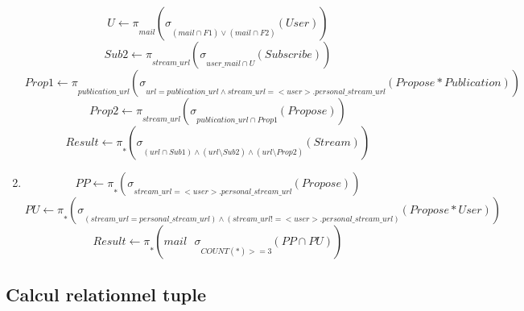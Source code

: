 \documentclass[a4paper,10pt]{article}
\begin{document}
\begin{enumerate}
\begin{equation}
		\end{equation}
		\begin{equation}
		U \leftarrow \pi \underset{mail}{} (\sigma \underset{(mail \cap F1) \vee (mail \cap F2) }{}(User))
		\end{equation}
		\begin{equation}
		Sub2 \leftarrow \pi \underset{stream\_url}{} (\sigma \underset{user\_mail \cap U}{}(Subscribe))
		\end{equation}
		\begin{equation}
		Prop1 \leftarrow \pi \underset{publication\_url}{} (\sigma \underset{url = publication\_url \wedge stream\_url = <user>.personal\_stream\_url}{}(Propose * Publication ))
		\end{equation}
		\begin{equation}
		Prop2 \leftarrow \pi \underset{stream\_url}{} (\sigma \underset{publication\_url \cap Prop1}{}(Propose))
		\end{equation}
		\begin{equation}
		Result \leftarrow \pi \underset{*}{} (\sigma \underset{(url \cap Sub1) \wedge (url \setminus Sub2) \wedge (url \setminus Prop2)}{}(Stream))
		\end{equation}
	    \item
	         \begin{equation}
		PP \leftarrow \pi \underset{*}{} (\sigma \underset{stream\_url = <user>.personal\_stream\_url}{}(Propose))
		\end{equation}
		\begin{equation}
		PU \leftarrow \pi \underset{*}{} (\sigma \underset{(stream\_url = personal\_stream\_url) \wedge (stream\_url != <user>.personal\_stream\_url)}{}(Propose*User))
		\end{equation}
	         \begin{equation}
		Result \leftarrow \pi \underset{*}{} (mail \  \  \  \sigma \underset{COUNT(*) >= 3}{}(PP \cap PU))
		\end{equation}
	\end{enumerate}
	
\subsection{Calcul relationnel tuple}

\end{document}
